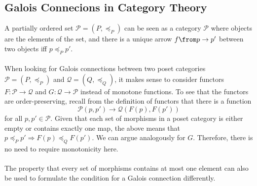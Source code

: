 \subsection*{Galois Connecions in Category Theory}
	A partially ordered set $\mathcal{P} = (P, \preceq_P)$ can be seen as a category $\mathscr P$ where objects are the elements of the set, and there is a unique arrow $f \from p \to p'$  between two objects iff $p \preceq_P p'.$\\\\
	When looking for Galois connections between two poset categories $\mathscr P = (P, \preceq_P)$ and $\mathscr Q = (Q, \preceq_Q)$, it makes sense to consider functors  $F : \mathscr P \rightarrow \mathscr Q$ and $G : \mathscr Q \rightarrow \mathscr P$ instead of monotone functions. To see that the functors are order-preserving, recall from the definition of functors that there is a function\[\mathscr P(p, p') \to\mathscr Q(F(p), F(p'))\] for all $p, p' \in \mathscr P$. Given that each set of morphisms in a poset category is either empty or contains exactly one map, the above means that $p \preceq_P p' \Rightarrow F(p) \preceq_Q F(p')$. We can argue analogously for $G$. Therefore, there is no need to require monotonicity here. \\\\
	The property that every set of morphisms contains at most one element can also be used to formulate the condition for a Galois connection differently.\\
	
